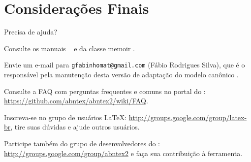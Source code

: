 \chapter{Considerações Finais}

Precisa de ajuda?

Consulte os manuais \abnTeX\ \cite{abntex2classe,abntex2cite,abntex2cite-alf}
e da classe \textsf{memoir} \cite{memoir}.

Envie um e-mail para \texttt{gfabinhomat@gmail.com} (Fábio Rodrigues Silva),
que é o responsável pela manutenção desta versão de adaptação do modelo canônico \abnTeX.

Consulte a FAQ com perguntas frequentes e comuns no portal do \abnTeX:
\url{https://github.com/abntex/abntex2/wiki/FAQ}.

Inscreva-se no grupo de usuários \LaTeX:
\url{http://groups.google.com/group/latex-br}, tire suas dúvidas e ajude
outros usuários.

Participe também do grupo de desenvolvedores do \abnTeX:
\url{http://groups.google.com/group/abntex2} e faça sua contribuição à
ferramenta.